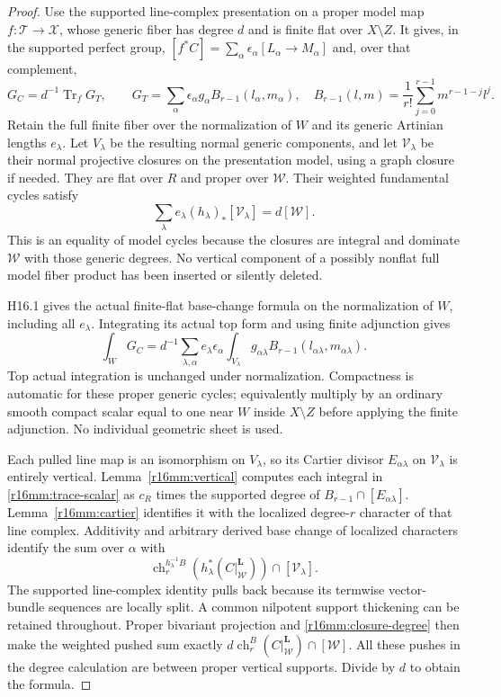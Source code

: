 \documentclass[11pt,a4paper]{article}
\theoremstyle{definition}
\theoremstyle{remark}
\numberwithin{equation}{section}
\begin{document}
\begin{proof}
Use the supported line-complex presentation on a proper
model map $f:\mathcal T\to\mathcal X$, whose generic fiber
has degree $d$ and is finite flat over $X\setminus Z$.
It gives, in the supported perfect group,
$[f^*C]=\sum_\alpha\epsilon_\alpha[L_\alpha\to M_\alpha]$
and, over that complement,
\[
 G_C=d^{-1}\operatorname{Tr}_f G_T,
 \qquad
 G_T=\sum_\alpha\epsilon_\alpha g_\alpha
                   B_{r-1}(l_\alpha,m_\alpha),
 \quad
 B_{r-1}(l,m)=\frac1{r!}\sum_{j=0}^{r-1}m^{r-1-j}l^j.
 \tag{MM16.4}\label{r16mm:presentation}
\]
Retain the full finite fiber over the normalization of $W$ and
its generic Artinian lengths $e_\lambda$. Let $V_\lambda$ be
the resulting normal generic components, and let
$\mathcal V_\lambda$ be their normal projective closures on
the presentation model, using a graph closure if needed. They
are flat over $R$ and proper over $\mathcal W$. Their weighted
fundamental cycles satisfy
\[
 \sum_\lambda e_\lambda
                   (h_\lambda)_*[\mathcal V_\lambda]
                                      =d[\mathcal W].
 \tag{MM16.5}\label{r16mm:closure-degree}
\]
This is an equality of model cycles because the closures are
integral and dominate $\mathcal W$ with those generic degrees.
No vertical component of a possibly nonflat full model fiber
product has been inserted or silently deleted.

H16.1 gives the actual finite-flat base-change formula on the
normalization of $W$, including all $e_\lambda$. Integrating
its actual top form and using finite adjunction gives
\[
 \int_WG_C=d^{-1}\sum_{\lambda,\alpha}
 e_\lambda\epsilon_\alpha
       \int_{V_\lambda}g_{\alpha\lambda}
                          B_{r-1}(l_{\alpha\lambda},m_{\alpha\lambda}).
 \tag{MM16.6}\label{r16mm:trace-scalar}
\]
Top actual integration is unchanged under normalization.
Compactness is automatic for these proper generic cycles;
equivalently multiply by an ordinary smooth compact scalar
equal to one near $W$ inside $X\setminus Z$ before applying
the finite adjunction. No individual geometric sheet is used.

Each pulled line map is an isomorphism on $V_\lambda$, so its
Cartier divisor $E_{\alpha\lambda}$ on $\mathcal V_\lambda$
is entirely vertical. Lemma~\ref{r16mm:vertical} computes each
integral in \eqref{r16mm:trace-scalar} as $c_R$ times the
supported degree of $B_{r-1}\cap[E_{\alpha\lambda}]$.
Lemma~\ref{r16mm:cartier} identifies it with the localized
degree-$r$ character of that line complex. Additivity and
arbitrary derived base change of localized characters identify
the sum over $\alpha$ with
\[
 \operatorname{ch}_r^{h_\lambda^{-1}B}
       (h_\lambda^*(C|^{\mathbf L}_{\mathcal W}))
                                         \cap[\mathcal V_\lambda].
\]
The supported line-complex identity pulls back because its
termwise vector-bundle sequences are locally split. A common
nilpotent support thickening can be retained throughout.
Proper bivariant projection and \eqref{r16mm:closure-degree}
then make the weighted pushed sum exactly
$d\operatorname{ch}_r^B(C|^{\mathbf L}_{\mathcal W})\cap[\mathcal W]$.
All these pushes in the degree calculation are between proper
vertical supports. Divide by $d$ to obtain the formula.
\end{proof}
\end{document}
